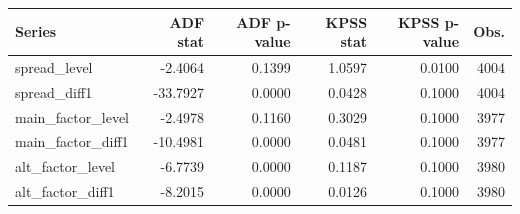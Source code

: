 \begin{tabular}{lrrrrr}
\toprule
Series & ADF stat & ADF p-value & KPSS stat & KPSS p-value & Obs. \\
\midrule
spread\_level & -2.4064 & 0.1399 & 1.0597 & 0.0100 & 4004 \\
spread\_diff1 & -33.7927 & 0.0000 & 0.0428 & 0.1000 & 4004 \\
main\_factor\_level & -2.4978 & 0.1160 & 0.3029 & 0.1000 & 3977 \\
main\_factor\_diff1 & -10.4981 & 0.0000 & 0.0481 & 0.1000 & 3977 \\
alt\_factor\_level & -6.7739 & 0.0000 & 0.1187 & 0.1000 & 3980 \\
alt\_factor\_diff1 & -8.2015 & 0.0000 & 0.0126 & 0.1000 & 3980 \\
\bottomrule
\end{tabular}
